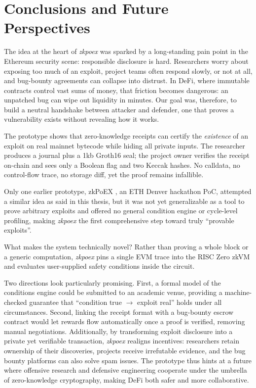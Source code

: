 \chapter{Conclusions and Future Perspectives}
\label{cap5}

The idea at the heart of \textit{zkpoex} was sparked by a long-standing pain point in the Ethereum security scene: responsible disclosure is hard.  
Researchers worry about exposing too much of an exploit, project teams often respond slowly, or not at all, and bug-bounty agreements can collapse into distrust. In DeFi, where immutable contracts control vast sums of money, that friction becomes dangerous: an unpatched bug can wipe out liquidity in minutes.  
Our goal was, therefore, to build a neutral handshake between attacker and defender, one that proves a vulnerability exists without revealing how it works.

The prototype shows that zero-knowledge receipts can certify the \emph{existence} of an exploit on real mainnet bytecode while hiding all private inputs.  
The researcher produces a journal plus a 1kb Groth16 seal; the project owner verifies the receipt on-chain and sees only a Boolean flag and two Keccak hashes.  
No calldata, no control-flow trace, no storage diff, yet the proof remains infallible.  

Only one earlier prototype, zkPoEX \cite{zkpoex-old}, an ETH Denver hackathon PoC, attempted a similar idea as said in this thesis, but it was not yet generalizable as a tool to prove arbitrary exploits and offered no general condition engine or cycle-level profiling, making \textit{zkpoex} the first comprehensive step toward truly “provable exploits”.


What makes the system technically novel? Rather than proving a whole block or a generic computation, \textit{zkpoex} pins a single EVM trace into the RISC Zero zkVM and evaluates user-supplied safety conditions inside the circuit.  

Two directions look particularly promising. First, a formal model of the conditions engine could be submitted to an academic venue, providing a machine-checked guarantee that “condition true $\rightarrow$ exploit real” holds under all circumstances. Second, linking the receipt format with a bug-bounty escrow contract would let rewards flow automatically once a proof is verified, removing manual negotiations.
Additionally, by transforming exploit disclosure into a private yet verifiable transaction, \textit{zkpoex} realigns incentives: researchers retain ownership of their discoveries, projects receive irrefutable evidence, and the bug bounty platforms can also solve spam issues. 
The prototype thus hints at a future where offensive research and defensive engineering cooperate under the umbrella of zero-knowledge cryptography, making DeFi both safer and more collaborative.

